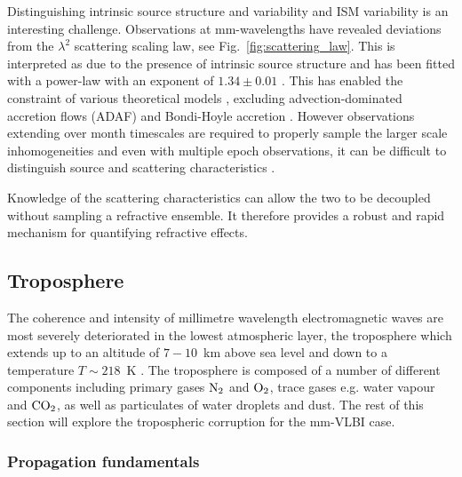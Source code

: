 Distinguishing intrinsic source structure and variability and ISM variability is an interesting challenge. Observations at mm-wavelengths have revealed deviations from the $\lambda^2$ scattering scaling law, see Fig.~\ref{fig:scattering_law}. This is interpreted as due to the presence of intrinsic source structure and has been fitted with a power-law with an exponent of $1.34 \pm 0.01$ \cite{Lu_2011}. This has enabled the constraint of various theoretical models \cite{Bower_2006}, excluding advection-dominated accretion flows (ADAF) \cite{Narayan_1998} and Bondi-Hoyle accretion \cite{Melia_1994}. However observations extending over month timescales are required to properly sample the larger scale inhomogeneities and even with multiple epoch observations, it can be difficult to distinguish source and scattering characteristics \citep*{Macquart_2006}.

Knowledge of the scattering characteristics can allow the two to be decoupled without sampling a refractive ensemble. It therefore provides
a robust and rapid mechanism for quantifying refractive effects.



\subsection{Troposphere}



The coherence and intensity of millimetre wavelength electromagnetic waves are most severely deteriorated in the lowest atmospheric layer, the troposphere which extends up to an altitude of $7-10$~km above sea level and down to a temperature $T \sim 218$~K \citep{Thompson_2001}. The troposphere is composed of a number of different components including primary gases $\rm N_2$ and  $\rm O_2$, trace gases e.g. water vapour and ${\rm CO_2}$, as well as particulates of water droplets and dust. The rest of this section will explore the tropospheric corruption for the mm-VLBI case. 


\subsubsection{Propagation fundamentals}

